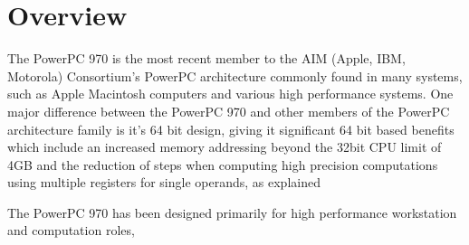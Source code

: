 \documentclass[a4paper,12pt]{article}
\begin{document}
\tableofcontents

\section{Overview}

The PowerPC 970 is the most recent member to the AIM (Apple, IBM,
Motorola) Consortium's PowerPC architecture commonly found in many 
systems, such as Apple Macintosh computers and various high 
performance systems. One major difference between the PowerPC 970 and other 
members of the PowerPC architecture family is it's 64 bit design, 
giving it significant 64 bit based benefits which include an 
increased memory addressing beyond the 32bit CPU limit of 4GB and 
the reduction of steps when computing high precision computations 
using multiple registers for single operands, as explained
\cite[here]{a6}

The PowerPC 970 has been designed primarily for high performance
workstation and computation roles, 

\begin{figure}[hb]

\begin{center}


\end{center}

\caption{\cite[The IBM PowerPC 970 Microprocessor Design Layout]{a6}}

\end{figure}
\end{document}
